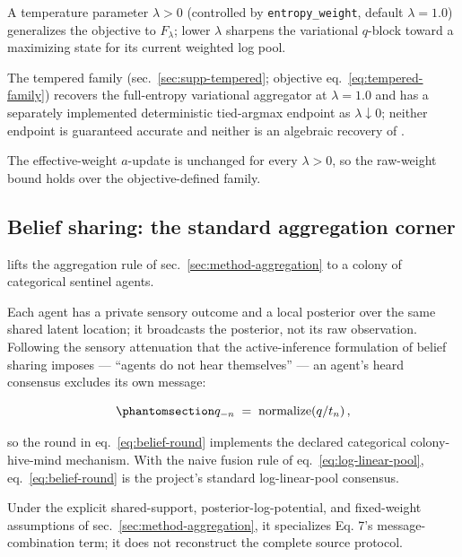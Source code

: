 \documentclass[
  english,
]{article}
\theoremstyle{plain}
\theoremstyle{definition}
\theoremstyle{remark}
\theoremstyle{definition}
\begin{document}
A temperature parameter \(\lambda>0\) (controlled by
\texttt{entropy\_weight}, default \(\lambda = 1.0\)) generalizes the
objective to \(F_\lambda\); lower \(\lambda\) sharpens the variational
\(q\)-block toward a maximizing state for its current weighted log pool.

The tempered family (sec.~\ref{sec:supp-tempered}; objective
eq.~\ref{eq:tempered-family}) recovers the full-entropy variational
aggregator at \(\lambda = 1.0\) and has a separately implemented
deterministic tied-argmax endpoint as \(\lambda\downarrow0\); neither
endpoint is guaranteed accurate and neither is an algebraic recovery of
.

The effective-weight \(a\)-update is unchanged for every \(\lambda>0\),
so the raw-weight bound holds over the objective-defined family.

\subsection{Belief sharing: the standard aggregation
corner}\label{sec:method-belief-sharing}

 lifts the aggregation rule of
sec.~\ref{sec:method-aggregation} to a colony of categorical sentinel
agents.

Each agent has a private sensory outcome and a local posterior over the
same shared latent location; it broadcasts the posterior, not its raw
observation. Following the sensory attenuation that the active-inference
formulation of belief sharing imposes \citep{friston2024federated} ---
``agents do not hear themselves'' --- an agent's heard consensus
excludes its own message:

\begin{equation}\protect\phantomsection\label{eq:belief-round}{q_{-n} \;=\; \mathrm{normalize}\!\left(q/t_n\right),}\end{equation}

so the round in eq.~\ref{eq:belief-round} implements the declared
categorical colony-hive-mind mechanism. With the naive fusion rule of
eq.~\ref{eq:log-linear-pool}, eq.~\ref{eq:belief-round} is the project's
standard log-linear-pool consensus.

Under the explicit shared-support, posterior-log-potential, and
fixed-weight assumptions of sec.~\ref{sec:method-aggregation}, it
specializes Eq. 7's message-combination term; it does not reconstruct
the complete source protocol.
\end{document}
